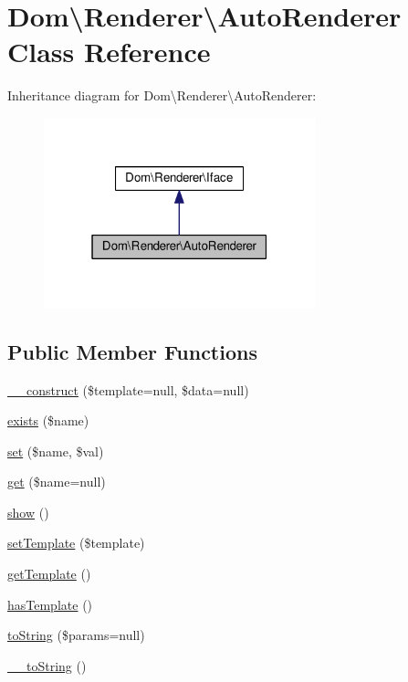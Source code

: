 \hypertarget{classDom_1_1Renderer_1_1AutoRenderer}{\section{Dom\textbackslash{}Renderer\textbackslash{}Auto\+Renderer Class Reference}
\label{classDom_1_1Renderer_1_1AutoRenderer}
}


Inheritance diagram for Dom\textbackslash{}Renderer\textbackslash{}Auto\+Renderer\+:\nopagebreak
\begin{figure}[H]
\begin{center}
\leavevmode
\includegraphics[width=223pt]{classDom_1_1Renderer_1_1AutoRenderer__inherit__graph}
\end{center}
\end{figure}
\subsection*{Public Member Functions}
\begin{DoxyCompactItemize}
\item 
\hyperlink{classDom_1_1Renderer_1_1AutoRenderer_a87d7af23e35fcbe2f3d5b31c8c5f0504}{\+\_\+\+\_\+construct} (\$template=null, \$data=null)
\item 
\hyperlink{classDom_1_1Renderer_1_1AutoRenderer_ac73a67b447e94321d31bd4f388f1b90a}{exists} (\$name)
\item 
\hyperlink{classDom_1_1Renderer_1_1AutoRenderer_ada481677e5252d2aa5cd03b46b6637f5}{set} (\$name, \$val)
\item 
\hyperlink{classDom_1_1Renderer_1_1AutoRenderer_ac9a2979a26a01180f2723d9dcbd97a1f}{get} (\$name=null)
\item 
\hyperlink{classDom_1_1Renderer_1_1AutoRenderer_a71ad96ed156aa79d45058b3bf372e73d}{show} ()
\item 
\hyperlink{classDom_1_1Renderer_1_1AutoRenderer_a8c34c043c962f53241f825579839750c}{set\+Template} (\$template)
\item 
\hyperlink{classDom_1_1Renderer_1_1AutoRenderer_a7c6ac2e26298cf2a8be324f6e44056cf}{get\+Template} ()
\item 
\hyperlink{classDom_1_1Renderer_1_1AutoRenderer_a0172677627adb5372fb026d177d57951}{has\+Template} ()
\item 
\hyperlink{classDom_1_1Renderer_1_1AutoRenderer_aa2b0c92e699c2e5454ed6da1de19c0bd}{to\+String} (\$params=null)
\item 
\hyperlink{classDom_1_1Renderer_1_1AutoRenderer_a79b361f403c09d7d1ccc81933b718017}{\+\_\+\+\_\+to\+String} ()
\end{DoxyCompactItemize}
